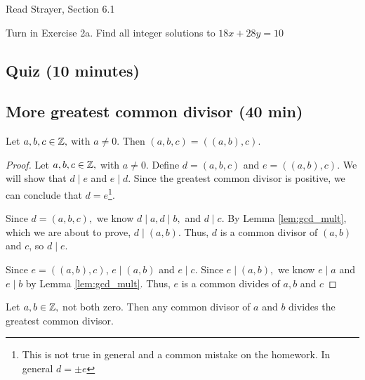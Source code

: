 \documentclass{ximera}
\begin{document}
\begin{pre}
 \item[Read] Strayer, Section 6.1
 \item[Turn in] Exercise 2a.
 Find all integer solutions to $18x+28y=10$
\end{pre}


\subsection{Quiz (10 minutes)}
\subsection{More greatest common divisor (40 min)} 

\begin{lemma}\label{lem:gcd_3case}
	Let $a,b,c\in\mathbb Z,$ with $a\neq 0$. Then $(a,b,c)=((a,b),c).$
\end{lemma}

 \begin{proof}
 	Let $a,b,c\in\mathbb Z,$ with $a\neq 0$. Define $d=(a,b,c)$ and $e=((a,b),c).$ We will show that $d\mid e$ and $e\mid d$. Since the greatest common divisor is positive, we can conclude that $d=e$\footnote{This is not true in general and a common mistake on the homework. In general $d=\pm e$}.

 	Since $d=(a,b,c),$ we know $d\mid a, d\mid b,$ and $d\mid c$. By Lemma \ref{lem:gcd_mult}, which we are about to prove, $d\mid (a,b)$. Thus, $d$ is a common divisor of $(a,b)$ and $c$, so $d\mid e$.

 	Since $e=((a,b),c)$, $e\mid  (a,b)$ and $e\mid c$. Since $e\mid (a,b),$ we know $e\mid a$ and $e\mid b$ by Lemma \ref{lem:gcd_mult}. Thus, $e$ is a common divides of $a,b$ and $c$
 \end{proof}

\begin{lemma}\label{lem:gcd_mult}
	Let $a,b\in\mathbb Z,$ not both zero. Then any  common divisor of $a$ and $b$ divides the greatest common divisor.
\end{lemma}
\end{document}
